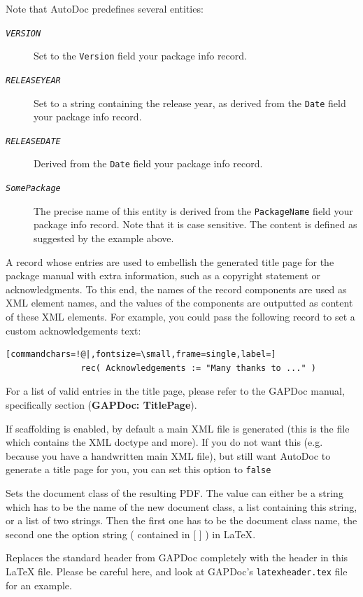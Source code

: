 \documentclass[a4paper,11pt]{report}
\begin{document}
{{{\begin{description}
\begin{description}
\begin{description}
 Note that \textsf{AutoDoc} predefines several entities: 
\begin{description}
\item[{\mbox{\texttt{\mdseries\slshape VERSION}}}] Set to the \texttt{Version} field your package info record.
\item[{\mbox{\texttt{\mdseries\slshape RELEASEYEAR}}}] Set to a string containing the release year, as derived from the \texttt{Date} field your package info record.
\item[{\mbox{\texttt{\mdseries\slshape RELEASEDATE}}}] Derived from the \texttt{Date} field your package info record.
\item[{\mbox{\texttt{\mdseries\slshape SomePackage}}}]  The precise name of this entity is derived from the \texttt{PackageName} field your package info record. Note that it is case sensitive. The content is
defined as suggested by the example above. 
\end{description}
 
\item[{\mbox{\texttt{\mdseries\slshape TitlePage}}}]  A record whose entries are used to embellish the generated title page for the
package manual with extra information, such as a copyright statement or
acknowledgments. To this end, the names of the record components are used as
XML element names, and the values of the components are outputted as content
of these XML elements. For example, you could pass the following record to set
a custom acknowledgements text: 
\begin{Verbatim}[commandchars=!@|,fontsize=\small,frame=single,label=]
               rec( Acknowledgements := "Many thanks to ..." )
\end{Verbatim}
 For a list of valid entries in the title page, please refer to the \textsf{GAPDoc} manual, specifically section  (\textbf{GAPDoc: TitlePage}). 
\item[{\mbox{\texttt{\mdseries\slshape MainPage}}}]  If scaffolding is enabled, by default a main XML file is generated (this is
the file which contains the XML doctype and more). If you do not want this
(e.g. because you have a handwritten main XML file), but still want \textsf{AutoDoc} to generate a title page for you, you can set this option to \texttt{false} 
\item[{\mbox{\texttt{\mdseries\slshape document{\textunderscore}class}}}]  Sets the document class of the resulting PDF. The value can either be a string
which has to be the name of the new document class, a list containing this
string, or a list of two strings. Then the first one has to be the document
class name, the second one the option string ( contained in [ ] ) in {\LaTeX}. 
\item[{\mbox{\texttt{\mdseries\slshape latex{\textunderscore}header{\textunderscore}file}}}]  Replaces the standard header from \textsf{GAPDoc} completely with the header in this {\LaTeX} file. Please be careful here, and look at \textsf{GAPDoc}'s \texttt{latexheader.tex} file for an example. 
\end{description}
 

\end{description}
\end{description}}}}
\end{document}
